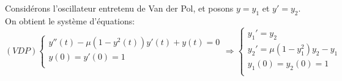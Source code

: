 \documentclass[a4paper,12pt,landscape]{article}
\begin{document}
\subsection{}
Considérons l'oscillateur entretenu de Van der Pol, et posons $y=y_1$ et $y'=y_2$.
On obtient le système d'équations:
\[(VDP)
\left\{
\begin{array}{ll}
y''(t)-\mu(1-y^{2}(t))y'(t)+y(t)=0\\
y(0)=y'(0)=1\\
\end{array}
\right.
\Rightarrow
\left\{
\begin{array}{ll}
y_1'=y_2\\
y_2'=\mu(1-y_1^{2})y_2-y_1\\
y_1(0)=y_2(0)=1\\
\end{array}
\right.
\]
\end{document}
